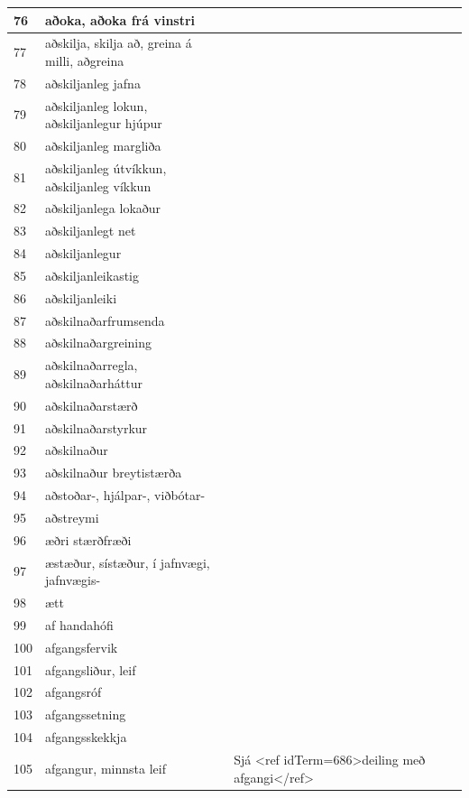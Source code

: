 \begin{longtable}{p{}|p{}|p{}|p{}|p{}}
\hline
76 & aðoka, aðoka frá vinstri &  &  &  \\
\hline
77 & aðskilja, skilja að, greina á milli, aðgreina &  &  &  \\
\hline
78 & aðskiljanleg jafna &  &  &  \\
\hline
79 & aðskiljanleg lokun, aðskiljanlegur hjúpur &  &  &  \\
\hline
80 & aðskiljanleg margliða &  &  &  \\
\hline
81 & aðskiljanleg útvíkkun, aðskiljanleg víkkun &  &  &  \\
\hline
82 & aðskiljanlega lokaður &  &  &  \\
\hline
83 & aðskiljanlegt net &  &  &  \\
\hline
84 & aðskiljanlegur &  &  &  \\
\hline
85 & aðskiljanleikastig &  &  &  \\
\hline
86 & aðskiljanleiki &  &  &  \\
\hline
87 & aðskilnaðarfrumsenda &  &  &  \\
\hline
88 & aðskilnaðargreining &  &  &  \\
\hline
89 & aðskilnaðarregla, aðskilnaðarháttur &  &  &  \\
\hline
90 & aðskilnaðarstærð &  &  &  \\
\hline
91 & aðskilnaðarstyrkur &  &  &  \\
\hline
92 & aðskilnaður &  &  &  \\
\hline
93 & aðskilnaður breytistærða &  &  &  \\
\hline
94 & aðstoðar-, hjálpar-, viðbótar- &  &  &  \\
\hline
95 & aðstreymi &  &  &  \\
\hline
96 & æðri stærðfræði &  &  &  \\
\hline
97 & æstæður, sístæður, í jafnvægi, jafnvægis- &  &  &  \\
\hline
98 & ætt &  &  &  \\
\hline
99 & af handahófi &  &  &  \\
\hline
100 & afgangsfervik &  &  &  \\
\hline
101 & afgangsliður, leif &  &  &  \\
\hline
102 & afgangsróf &  &  &  \\
\hline
103 & afgangssetning &  &  &  \\
\hline
104 & afgangsskekkja &  &  &  \\
\hline
105 & afgangur, minnsta leif & Sjá <ref idTerm=686>deiling með afgangi</ref> &  &  \\

\end{longtable}
